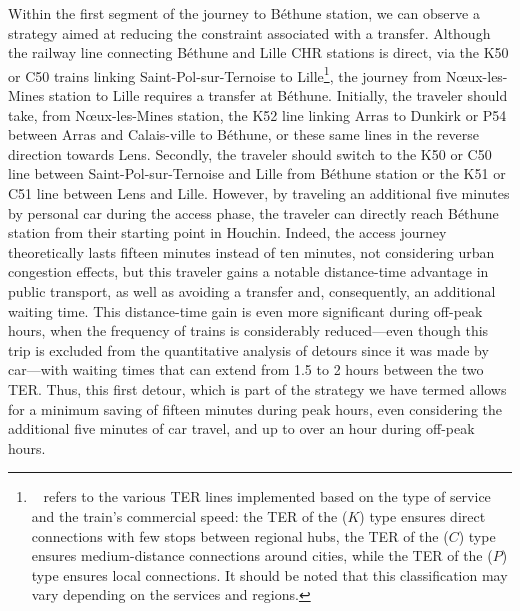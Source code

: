 \begin{refsegment}
Within the first segment of the journey to Béthune station, we can observe a strategy aimed at reducing the constraint associated with a transfer. Although the railway line connecting Béthune and Lille CHR stations is direct, via the K50 or C50 trains linking Saint-Pol-sur-Ternoise to Lille\footnote{~
    \textcolor{blue}{\textcite[468]{sncf_voyageurs_trains_nodate}} refers to the various \acrshort{TER} lines implemented based on the type of service and the train's commercial speed: the \acrshort{TER} of the  (\(K\)) type ensures direct connections with few stops between regional hubs, the \acrshort{TER} of the  (\(C\)) type ensures medium-distance connections around cities, while the \acrshort{TER} of the  (\(P\)) type ensures local connections. It should be noted that this classification may vary depending on the services and regions.
}, the journey from Nœux-les-Mines station to Lille requires a transfer at Béthune. Initially, the traveler should take, from Nœux-les-Mines station, the K52 line linking Arras to Dunkirk or P54 between Arras and Calais-ville to Béthune, or these same lines in the reverse direction towards Lens. Secondly, the traveler should switch to the K50 or C50 line between Saint-Pol-sur-Ternoise and Lille from Béthune station or the K51 or C51 line between Lens and Lille. However, by traveling an additional five minutes by personal car during the access phase, the traveler can directly reach Béthune station from their starting point in Houchin. Indeed, the access journey theoretically lasts fifteen minutes instead of ten minutes, not considering urban congestion effects, but this traveler gains a notable distance-time advantage in public transport, as well as avoiding a transfer and, consequently, an additional waiting time. This distance-time gain is even more significant during off-peak hours, when the frequency of trains is considerably reduced—even though this trip is excluded from the quantitative analysis of detours since it was made by car—with waiting times that can extend from 1.5 to 2 hours between the two \acrshort{TER}. Thus, this first detour, which is part of the strategy we have termed  allows for a minimum saving of fifteen minutes during peak hours, even considering the additional five minutes of car travel, and up to over an hour during off-peak hours.%


\end{refsegment}
